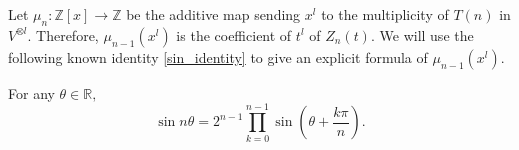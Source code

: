 \documentclass[11 pt]{amsart}
\theoremstyle{plain}
\theoremstyle{definition}
\theoremstyle{remark}
\def\R{\mathbb{R}}
\def\Z{\mathbb{Z}}
\def\xx{\otimes}
\def\b{\beta}
\def\m{\mu}
\begin{document}
Let $\m_n: \Z[x] \to \Z$ be the additive map sending $x^l$ to the multiplicity of $T(n)$ in $V^{\xx l}$. Therefore, $\m_{n-1}(x^l)$ is the coefficient of $t^l$ of $Z_n(t).$ We will use the following known identity \eqref{sin_identity} to give an explicit formula of $\m_{n-1}(x^l)$.


For any $\theta \in \R,$
\begin{equation}\label{sin_identity}
     \sin n\theta =2^{n-1} \prod_{k=0}^{n-1} \sin( \theta + \frac{k\pi}{n}). 
\end{equation} 
       

\end{document}
